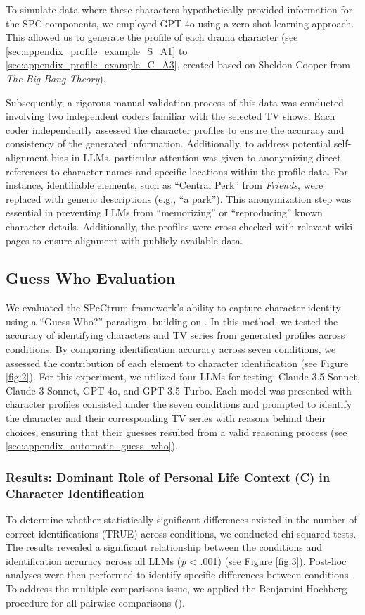 To simulate data where these characters hypothetically provided information for the SPC components, we employed GPT-4o \citep{yuan_evaluating_2024} using a zero-shot learning approach. This allowed us to generate the profile of each drama character (see \ref{sec:appendix_profile_example_S_A1} to \ref{sec:appendix_profile_example_C_A3}, created based on Sheldon Cooper from \textit{The Big Bang Theory}).


Subsequently, a rigorous manual validation process of this data was conducted involving two independent coders familiar with the selected TV shows. Each coder independently assessed the character profiles to ensure the accuracy and consistency of the generated information. Additionally, to address potential self-alignment bias in LLMs, particular attention was given to anonymizing direct references to character names and specific locations within the profile data. For instance, identifiable elements, such as ``Central Perk'' from \textit{Friends}, were replaced with generic descriptions (e.g., “a park”). This anonymization step was essential in preventing LLMs from ``memorizing'' or ``reproducing'' known character details. Additionally, the profiles were cross-checked with relevant wiki pages to ensure alignment with publicly available data.


\subsection{Guess Who Evaluation}
We evaluated the SPeCtrum framework's ability to capture character identity using a ``Guess Who?'' paradigm, building on \citet{sang_tvshowguess_2022}. In this method, we tested the accuracy of identifying characters and TV series from generated profiles across conditions. By comparing identification accuracy across seven conditions, we assessed the contribution of each element to character identification (see Figure \ref{fig:2}). For this experiment, we utilized four LLMs for testing: Claude-3.5-Sonnet, Claude-3-Sonnet, GPT-4o, and GPT-3.5 Turbo. Each model was presented with character profiles consisted under the seven conditions and prompted to identify the character and their corresponding TV series with reasons behind their choices, ensuring that their guesses resulted from a valid reasoning process (see \ref{sec:appendix_automatic_guess_who}). 


\subsubsection{Results: Dominant Role of Personal Life Context (C) in Character Identification}
To determine whether statistically significant differences existed in the number of correct identifications (TRUE) across conditions, we conducted chi-squared tests. The results revealed a significant relationship between the conditions and identification accuracy across all LLMs (\textit{p} < .001) (see Figure \ref{fig:3}). Post-hoc analyses were then performed to identify specific differences between conditions. To address the multiple comparisons issue, we applied the Benjamini-Hochberg procedure for all pairwise comparisons (\citealp{thissen2002quick}).

